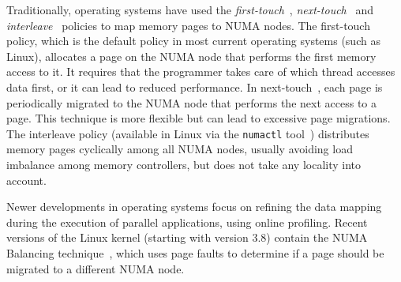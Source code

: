 
Traditionally, operating systems have used the \emph{first-touch}~\cite{Marchetti1995}, \emph{next-touch}~\cite{Lof2005} and \emph{interleave}~\cite{Kleen2004} policies to map memory pages to NUMA nodes.
The first-touch policy, which is the default policy in most current operating systems (such as Linux), allocates a page on the NUMA node that performs the first memory access to it.
It requires that the programmer takes care of which thread accesses data
first, or it can lead to reduced performance.
In next-touch~\cite{Lof2005}, each page is periodically migrated to the NUMA
node that performs the next access to a page. This technique is more flexible
but can lead to excessive page migrations.
The interleave policy (available in Linux via the \texttt{numactl}
tool~\cite{Kleen2004}) distributes memory pages cyclically among all NUMA nodes,
usually avoiding load imbalance among memory controllers, but does not take any locality into account.

Newer developments in operating systems focus on refining the data mapping during the execution of parallel applications, using online profiling.
Recent versions of the Linux kernel (starting with version 3.8) contain the
NUMA Balancing technique~\cite{Corbet}, which uses page faults to determine if
a page should be migrated to a different NUMA node.%

